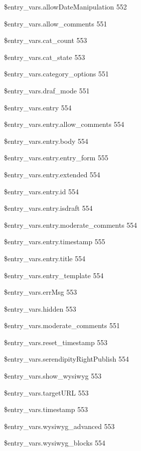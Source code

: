 \documentclass{book}
\renewcommand\subitem{\par}
\begin{document}
\begin{multicols}{2}
\begin{osp-index}
    \subitem \$entry\_vars.allowDateManipulation\hspace{1mm} 552
    \subitem \$entry\_vars.allow\_comments\hspace{1mm} 551
    \subitem \$entry\_vars.cat\_count\hspace{1mm} 553
    \subitem \$entry\_vars.cat\_state\hspace{1mm} 553
    \subitem \$entry\_vars.category\_options\hspace{1mm} 551
    \subitem \$entry\_vars.draf\_mode\hspace{1mm} 551
    \subitem \$entry\_vars.entry\hspace{1mm} 554
    \subitem \$entry\_vars.entry.allow\_comments\hspace{1mm} 554
    \subitem \$entry\_vars.entry.body\hspace{1mm} 554
    \subitem \$entry\_vars.entry.entry\_form\hspace{1mm} 555
    \subitem \$entry\_vars.entry.extended\hspace{1mm} 554
    \subitem \$entry\_vars.entry.id\hspace{1mm} 554
    \subitem \$entry\_vars.entry.isdraft\hspace{1mm} 554
    \subitem \$entry\_vars.entry.moderate\_comments\hspace{1mm} 554
    \subitem \$entry\_vars.entry.timestamp\hspace{1mm} 555
    \subitem \$entry\_vars.entry.title\hspace{1mm} 554
    \subitem \$entry\_vars.entry\_template\hspace{1mm} 554
    \subitem \$entry\_vars.errMsg\hspace{1mm} 553
    \subitem \$entry\_vars.hidden\hspace{1mm} 553
    \subitem \$entry\_vars.moderate\_comments\hspace{1mm} 551
    \subitem \$entry\_vars.reset\_timestamp\hspace{1mm} 553
    \subitem \$entry\_vars.serendipityRightPublish\hspace{1mm} 554
    \subitem \$entry\_vars.show\_wysiwyg\hspace{1mm} 553
    \subitem \$entry\_vars.targetURL\hspace{1mm} 553
    \subitem \$entry\_vars.timestamp\hspace{1mm} 553
    \subitem \$entry\_vars.wysiwyg\_advanced\hspace{1mm} 553
    \subitem \$entry\_vars.wysiwyg\_blocks\hspace{1mm} 554

\end{osp-index}
\end{multicols}
\end{document}
